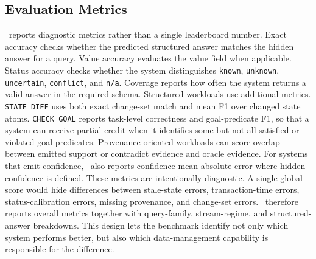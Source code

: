 \subsection{Evaluation Metrics}

\bench\ reports diagnostic metrics rather than a single leaderboard number. Exact accuracy checks whether the predicted structured answer matches the hidden answer for a query. Value accuracy evaluates the value field when applicable. Status accuracy checks whether the system distinguishes \texttt{known}, \texttt{unknown}, \texttt{uncertain}, \texttt{conflict}, and \texttt{n/a}. Coverage reports how often the system returns a valid answer in the required schema.
Structured workloads use additional metrics. \texttt{STATE\_DIFF} uses both exact change-set match and mean F1 over changed state atoms. \texttt{CHECK\_GOAL} reports task-level correctness and goal-predicate F1, so that a system can receive partial credit when it identifies some but not all satisfied or violated goal predicates. Provenance-oriented workloads can score overlap between emitted support or contradict evidence and oracle evidence. For systems that emit confidence, \bench\ also reports confidence mean absolute error where hidden confidence is defined.
These metrics are intentionally diagnostic. A single global score would hide differences between stale-state errors, transaction-time errors, status-calibration errors, missing provenance, and change-set errors. \bench\ therefore reports overall metrics together with query-family, stream-regime, and structured-answer breakdowns. This design lets the benchmark identify not only which system performs better, but also which data-management capability is responsible for the difference.

